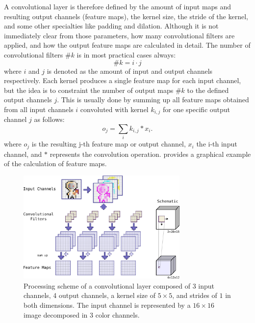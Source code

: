 A convolutional layer is therefore defined by the amount of input maps and resulting output channels (feature maps), the kernel size, the stride of the kernel, and some other specialties like padding and dilation.
Although it is not immediately clear from those parameters, how many convolutional filters are applied, and how the output feature maps are calculated in detail.
The number of convolutional filters $\#k$ is in most practical cases always:
\begin{equation}\label{eq:nn_theory_n_filters}
  \#k = i \cdot j
\end{equation}
where $i$ and $j$ is denoted as the amount of input and output channels respectively.
Each kernel produces a single feature map for each input channel, but the idea is to constraint the number of output maps $\#k$ to the defined output channels $j$.
This is usually done by summing up all feature maps obtained from all input channels $i$ convoluted with kernel $k_{i, j}$ for one specific output channel $j$ as follows:
\begin{equation}
  o_j = \sum_{i} k_{i, j} \ast x_i.
\end{equation}
where $o_j$ is the resulting j-th feature map or output channel, $x_i$ the i-th input channel, and $\ast$ represents the convolution operation.
 provides a graphical example of the calculation of feature maps.
\begin{figure}[!ht]
  \centering
    \includegraphics[width=0.75\textwidth]{./4_nn/figs/nn_theory_cnn_basics.pdf}
  \caption{Processing scheme of a convolutional layer composed of 3 input channels, 4 output channels, a kernel size of $5 \times 5$, and strides of $1$ in both dimensions. The input channel is represented by a $16 \times 16$ image decomposed in 3 color channels.}
  \label{fig:nn_theory_cnn_basics}
\end{figure}
\FloatBarrier
\noindent

